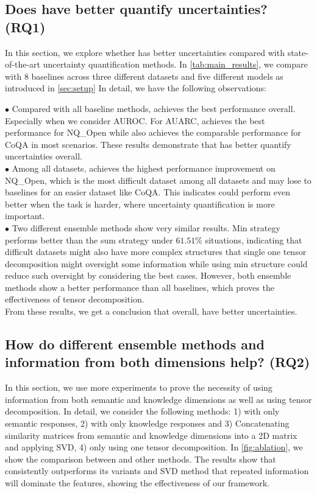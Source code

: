 \subsection{Does \ours have better quantify uncertainties? (RQ1)}
\label{sec:main_result}
In this section, we explore whether \ours has better uncertainties compared with state-of-the-art uncertainty quantification methods. In \cref{tab:main_results}, we compare \ours with 8 baselines across three different datasets and five different models as introduced in \cref{sec:setup} In detail, we have the following observations:

\noindent $\bullet$ Compared with all baseline methods, \ours achieves the best performance overall. Especially when we consider AUROC. For AUARC, \ours achieves the best performance for NQ\_Open while \ours also achieves the comparable performance for CoQA in most scenarios. These results demonstrate that \ours has better quantify uncertainties overall. \\
\noindent $\bullet$ Among all datasets, \ours achieves the highest performance improvement on NQ\_Open, which is the most difficult dataset among all datasets and may lose to baselines for an easier dataset like CoQA. This indicates \ours could perform even better when the task is harder, where uncertainty quantification is more important. \\
\noindent $\bullet$ Two different ensemble methods show very similar results. Min strategy performs better than the sum strategy under $61.51\%$ situations, indicating that difficult datasets might also have more complex structures that single one tensor decomposition might oversight some information while using min structure could reduce such oversight by considering the best cases. However, both ensemble methods show a better performance than all baselines, which proves the effectiveness of tensor decomposition. \\

From these results, we get a conclusion that overall, \ours have better uncertainties.


\subsection{How do different ensemble methods and information from both dimensions help? (RQ2)}
\label{sec:ablation}
In this section, we use more experiments to prove the necessity of using information from both semantic and knowledge dimensions as well as using tensor decomposition. In detail, we consider the following methods: 1) \ours with only semantic responses, 2) \ours with only knowledge responses and 3) Concatenating similarity matrices from semantic and knowledge dimensions into a 2D matrix and applying SVD, 4) only using one tensor decomposition. In \cref{fig:ablation}, we show the comparison between \ours and other methods.  The results show that \ours consistently outperforms its variants and SVD method that repeated information will dominate the features, showing the effectiveness of our framework.




